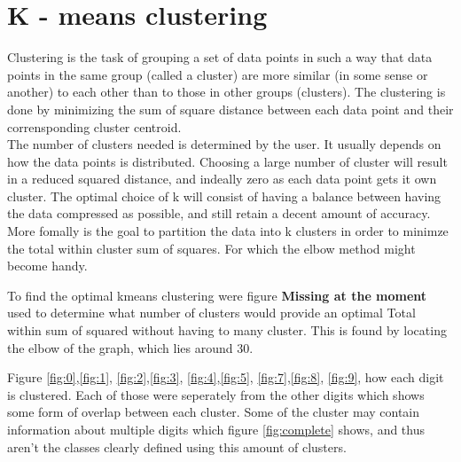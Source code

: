 \documentclass[10pt,a4paper]{article}
\begin{document}
\section{K - means clustering}
Clustering is the task of grouping a set of data points in such a way that data points in the same group (called a cluster) are more similar (in some sense or another) to each other than to those in other groups (clusters).
The clustering is done by minimizing  the sum of square distance between each data point and their corrensponding cluster centroid.  \\

The number of clusters needed  is determined by the user. It usually depends on how the data points  is distributed. Choosing a large number of cluster will result in a reduced squared distance, and indeally zero as each data point gets it own cluster.  The optimal choice of k will consist of having a balance between having the data compressed as possible, and still retain a decent amount of accuracy.  More fomally is the goal to partition the data  into k clusters in order to minimze the total within cluster sum of squares.  For which the elbow method might become handy. \\



To find the optimal kmeans clustering were figure \textbf{Missing at the moment} used to determine what number of clusters would provide an optimal Total within sum of squared without having to many cluster.  This is found by locating the elbow of the graph, which lies around 30. 

Figure \ref{fig:0},\ref{fig:1}, \ref{fig:2},\ref{fig:3}, \ref{fig:4},\ref{fig:5}, \ref{fig:7},\ref{fig:8}, \ref{fig:9}, how each digit is clustered.  Each of those were seperately from the other digits which shows some form of overlap between each cluster. Some of the  cluster may contain information about multiple digits which figure \ref{fig:complete} shows, and thus aren't the classes clearly defined using this amount of clusters. 
\end{document}
